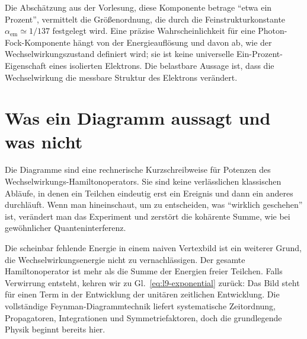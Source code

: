 Die Abschätzung aus der Vorlesung, diese Komponente betrage ``etwa ein Prozent'', vermittelt die Größenordnung, die durch die Feinstrukturkonstante \(\alpha_{\mathrm{em}}\simeq 1/137\) festgelegt wird. Eine präzise Wahrscheinlichkeit für eine Photon-Fock-Komponente hängt von der Energieauflösung und davon ab, wie der Wechselwirkungszustand definiert wird; sie ist keine universelle Ein-Prozent-Eigenschaft eines isolierten Elektrons. Die belastbare Aussage ist, dass die Wechselwirkung die messbare Struktur des Elektrons verändert.

\section{Was ein Diagramm aussagt und was nicht}

Die Diagramme sind eine rechnerische Kurzschreibweise für Potenzen des Wechselwirkungs-Hamiltonoperators. Sie sind keine verlässlichen klassischen Abläufe, in denen ein Teilchen eindeutig erst ein Ereignis und dann ein anderes durchläuft. Wenn man hineinschaut, um zu entscheiden, was ``wirklich geschehen'' ist, verändert man das Experiment und zerstört die kohärente Summe, wie bei gewöhnlicher Quanteninterferenz.

\begin{classroomqa}\end{classroomqa}

Die scheinbar fehlende Energie in einem naiven Vertexbild ist ein weiterer Grund, die Wechselwirkungsenergie nicht zu vernachlässigen. Der gesamte Hamiltonoperator ist mehr als die Summe der Energien freier Teilchen. Falls Verwirrung entsteht, kehren wir zu Gl.~\eqref{eq:l9-exponential} zurück: Das Bild steht für einen Term in der Entwicklung der unitären zeitlichen Entwicklung. Die vollständige Feynman-Diagrammtechnik liefert systematische Zeitordnung, Propagatoren, Integrationen und Symmetriefaktoren, doch die grundlegende Physik beginnt bereits hier.

